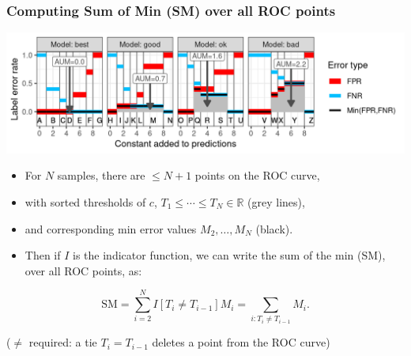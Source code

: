 \documentclass[t]{beamer}
\begin{document}
\begin{frame}
  \frametitle{Computing Sum of Min (SM) over all ROC points}
  \includegraphics[width=\textwidth]{figure-more-than-one-new-binary-aum-rate}
  \vskip -0.2cm
  \begin{itemize}
  \item For $N$ samples, there are $\leq N+1$ points on the ROC curve,
  \item with sorted thresholds of $c$,  $T_1\leq\cdots\leq T_N\in\mathbb R$ (grey lines), 
  \item and corresponding min error values $M_2,\dots,M_N$ (black).
  \item Then if $I$ is the indicator function, we can write the sum of
    the min (SM), over all ROC points, as:
  \end{itemize}
\begin{equation*}
  \label{eq:SM-computation}
    \text{SM} =
    \sum_{i=2}^{N}
    I[ T_{i} \neq T_{i-1} ]
    M_i =
    \sum_{i:T_{i} \neq T_{i-1} }
    M_i.
\end{equation*}

($\neq$ required: a tie $T_i=T_{i-1}$ deletes a point from the ROC curve)

\end{frame}
\end{document}
